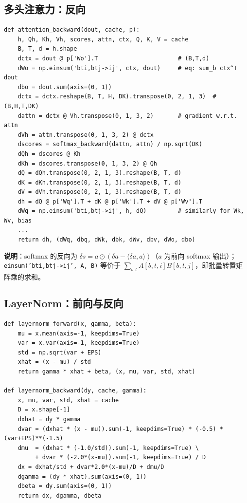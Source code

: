 \documentclass[11pt,a4paper]{article}
\begin{document}
\subsection{多头注意力：反向}

\begin{lstlisting}
def attention_backward(dout, cache, p):
    h, Qh, Kh, Vh, scores, attn, ctx, Q, K, V = cache
    B, T, d = h.shape
    dctx = dout @ p['Wo'].T                       # (B,T,d)
    dWo = np.einsum('bti,btj->ij', ctx, dout)     # eq: sum_b ctx^T dout
    dbo = dout.sum(axis=(0, 1))
    dctx = dctx.reshape(B, T, H, DK).transpose(0, 2, 1, 3)  # (B,H,T,DK)
    dattn = dctx @ Vh.transpose(0, 1, 3, 2)       # gradient w.r.t. attn
    dVh = attn.transpose(0, 1, 3, 2) @ dctx
    dscores = softmax_backward(dattn, attn) / np.sqrt(DK)
    dQh = dscores @ Kh
    dKh = dscores.transpose(0, 1, 3, 2) @ Qh
    dQ = dQh.transpose(0, 2, 1, 3).reshape(B, T, d)
    dK = dKh.transpose(0, 2, 1, 3).reshape(B, T, d)
    dV = dVh.transpose(0, 2, 1, 3).reshape(B, T, d)
    dh = dQ @ p['Wq'].T + dK @ p['Wk'].T + dV @ p['Wv'].T
    dWq = np.einsum('bti,btj->ij', h, dQ)         # similarly for Wk, Wv, bias
    ...
    return dh, (dWq, dbq, dWk, dbk, dWv, dbv, dWo, dbo)
\end{lstlisting}

\textbf{说明}：softmax 的反向为 $\delta s = a \odot (\delta a - \langle \delta a, a\rangle)$（$a$ 为前向 softmax 输出）；\texttt{einsum('bti,btj->ij', A, B)} 等价于 $\sum_{b,t} A[b,t,i]B[b,t,j]$，即批量转置矩阵乘的求和。

\subsection{LayerNorm：前向与反向}

\begin{lstlisting}
def layernorm_forward(x, gamma, beta):
    mu = x.mean(axis=-1, keepdims=True)
    var = x.var(axis=-1, keepdims=True)
    std = np.sqrt(var + EPS)
    xhat = (x - mu) / std
    return gamma * xhat + beta, (x, mu, var, std, xhat)

def layernorm_backward(dy, cache, gamma):
    x, mu, var, std, xhat = cache
    D = x.shape[-1]
    dxhat = dy * gamma
    dvar = (dxhat * (x - mu)).sum(-1, keepdims=True) * (-0.5) * (var+EPS)**(-1.5)
    dmu  = (dxhat * (-1.0/std)).sum(-1, keepdims=True) \
         + dvar * (-2.0*(x-mu)).sum(-1, keepdims=True) / D
    dx = dxhat/std + dvar*2.0*(x-mu)/D + dmu/D
    dgamma = (dy * xhat).sum(axis=(0, 1))
    dbeta = dy.sum(axis=(0, 1))
    return dx, dgamma, dbeta
\end{lstlisting}
\end{document}
